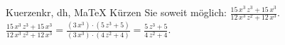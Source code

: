 \begin{MAufgabe}{Kuerzen}{kr, dh, MaTeX}
K\"urzen Sie soweit m\"oglich: $\frac{15\, x^3\, z^3 + 15\, x^3}{12\, x^3\, z^2 + 12\, x^3}$.\\ 
\ifLsg\MLoesung
\quad $\frac{15\, x^3\, z^3 + 15\, x^3}{12\, x^3\, z^2 + 12\, x^3}=\frac{(3\, x^3)\cdot(5\, z^3 + 5)}{(3\, x^3)\cdot(4\, z^2 + 4)}=\frac{5\, z^3 + 5}{4\, z^2 + 4}$.\else\relax\fi
 \end{MAufgabe}